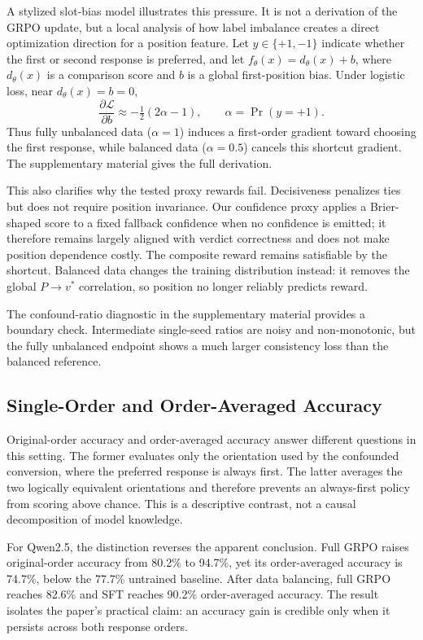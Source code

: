 \documentclass[letterpaper]{article}
\begin{document}
A stylized slot-bias model illustrates this pressure. It is not a derivation of the GRPO update, but a local analysis of how label imbalance creates a direct optimization direction for a position feature. Let $y \in \{+1,-1\}$ indicate whether the first or second response is preferred, and let $f_\theta(x)=d_\theta(x)+b$, where $d_\theta(x)$ is a comparison score and $b$ is a global first-position bias. Under logistic loss, near $d_\theta(x)=b=0$,
\[
\frac{\partial \mathcal{L}}{\partial b}
\approx -\tfrac{1}{2}(2\alpha-1),
\qquad \alpha=\Pr(y=+1).
\]
Thus fully unbalanced data ($\alpha=1$) induces a first-order gradient toward choosing the first response, while balanced data ($\alpha=0.5$) cancels this shortcut gradient. The supplementary material gives the full derivation.

This also clarifies why the tested proxy rewards fail. Decisiveness penalizes ties but does not require position invariance. Our confidence proxy applies a Brier-shaped score to a fixed fallback confidence when no confidence is emitted; it therefore remains largely aligned with verdict correctness and does not make position dependence costly. The composite reward remains satisfiable by the shortcut. Balanced data changes the training distribution instead: it removes the global $P \to v^*$ correlation, so position no longer reliably predicts reward.

The confound-ratio diagnostic in the supplementary material provides a boundary check. Intermediate single-seed ratios are noisy and non-monotonic, but the fully unbalanced endpoint shows a much larger consistency loss than the balanced reference.

\subsection{Single-Order and Order-Averaged Accuracy}

Original-order accuracy and order-averaged accuracy answer different questions in this setting. The former evaluates only the orientation used by the confounded conversion, where the preferred response is always first. The latter averages the two logically equivalent orientations and therefore prevents an always-first policy from scoring above chance. This is a descriptive contrast, not a causal decomposition of model knowledge.

For Qwen2.5, the distinction reverses the apparent conclusion. Full GRPO raises original-order accuracy from 80.2\% to 94.7\%, yet its order-averaged accuracy is 74.7\%, below the 77.7\% untrained baseline. After data balancing, full GRPO reaches 82.6\% and SFT reaches 90.2\% order-averaged accuracy. The result isolates the paper's practical claim: an accuracy gain is credible only when it persists across both response orders.
\end{document}
